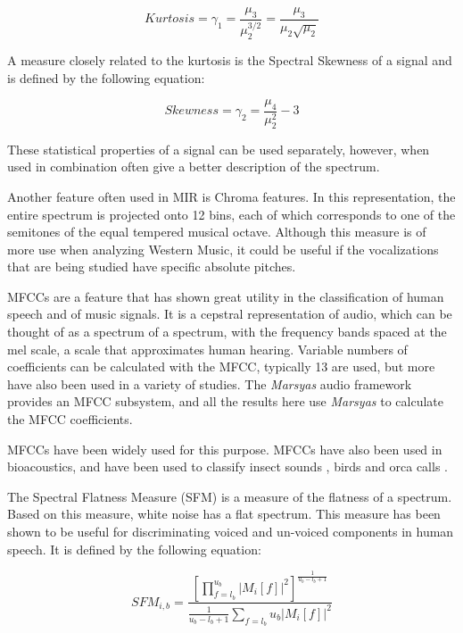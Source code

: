 \begin{equation} 
Kurtosis = \gamma_1 = \frac{\mu_3}{\mu_2^{3/2}} = \frac{\mu_3}{\mu_2 \sqrt{\mu_2}} 
\end{equation}

\noindent A measure closely related to the kurtosis is the Spectral Skewness of
a signal and is defined by the following equation:

\begin{equation} 
Skewness = \gamma_2 = \frac{\mu_4}{\mu_2^2} - 3 
\end{equation}

\noindent These statistical properties of a signal can be used separately,
however, when used in combination often give a better description of
the spectrum.

Another feature often used in MIR is Chroma features.  In this
representation, the entire spectrum is projected onto 12 bins, each of
which corresponds to one of the semitones of the equal tempered
musical octave.  Although this measure is of more use when analyzing
Western Music, it could be useful if the vocalizations that are being
studied have specific absolute pitches.

MFCCs are a feature that has shown great utility in the classification
of human speech and of music signals.  It is a cepstral representation
of audio, which can be thought of as a spectrum of a spectrum, with
the frequency bands spaced at the mel scale, a scale that approximates
human hearing.  Variable numbers of coefficients can be calculated
with the MFCC, typically 13 are used, but more have also been used in
a variety of studies.  The \textit{Marsyas} audio framework provides an MFCC
subsystem, and all the results here use \textit{Marsyas} to calculate the MFCC
coefficients.

MFCCs \cite{logan2000mfcc} have been widely used for this purpose.
MFCCs have also been used in bioacoustics, and have been used to
classify insect sounds \cite{leqing2011insect}, birds
\cite{changhsing2007automatic} and orca calls \cite{ness2008chants}.

The Spectral Flatness Measure (SFM) \cite{hosseinzadeh2007mfcc} is a
measure of the flatness of a spectrum.  Based on this measure, white noise
has a flat spectrum.  This measure has been shown to be useful for
discriminating voiced and un-voiced components in human speech.  It is
defined by the following equation:

\begin{equation} 
SFM_{i,b} =  \frac{[\prod_{f=l_b}^{u_b} {|M_i [f]|}^2]^\frac{1}{u_b - l_b + 1}}
	{\frac{1}{u_b - l_b + 1}\sum_{f=l_b}{u_b} {|M_i[f]|^2}} 
\end{equation}

